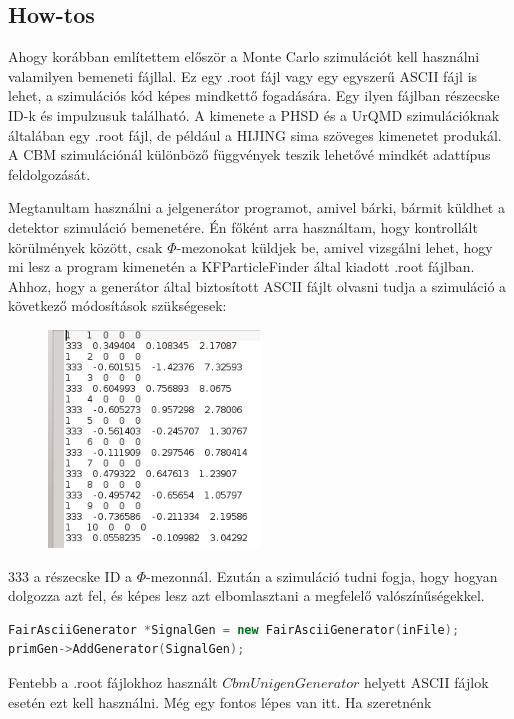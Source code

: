 \documentclass[a4paper,12pt]{article}
\begin{document}
\subsection{ How-tos}
\vspace{3mm}
\par Ahogy korábban említettem először a Monte Carlo szimulációt kell használni valamilyen bemeneti fájllal. Ez egy .root fájl vagy egy 
egyszerű ASCII fájl is lehet, a szimulációs kód képes mindkettő fogadására. Egy ilyen fájlban részecske ID-k és impulzusuk található. A kimenete 
a PHSD és a UrQMD szimulációknak általában egy .root fájl, de például a HIJING sima szöveges kimenetet produkál. A CBM szimulációnál különböző 
függvények teszik lehetővé mindkét adattípus feldolgozását.
\vspace{3mm}
\par Megtanultam használni a jelgenerátor programot, amivel bárki, bármit küldhet a detektor szimuláció bemenetére. Én főként arra használtam, hogy
kontrollált körülmények között, csak $\Phi$-mezonokat küldjek be, amivel vizsgálni lehet, hogy mi lesz a program kimenetén a KFParticleFinder
által kiadott .root fájlban. Ahhoz, hogy a generátor által biztosított ASCII fájlt olvasni tudja a szimuláció a következő módosítások szükségesek:
\begin{figure}[H]
	\centering
	\includegraphics[width=0.5\textwidth]{input.png}
\end{figure}
\par 333 a részecske ID a $\Phi$-mezonnál. Ezután a szimuláció tudni fogja, hogy hogyan dolgozza azt fel, és képes lesz azt elbomlasztani
a megfelelő valószínűségekkel. 
\begin{lstlisting}[language=C++]
FairAsciiGenerator *SignalGen = new FairAsciiGenerator(inFile);
primGen->AddGenerator(SignalGen);
\end{lstlisting}
Fentebb a .root fájlokhoz használt $CbmUnigenGenerator$ helyett ASCII fájlok esetén ezt kell használni. Még egy fontos lépes van itt. Ha szeretnénk
\end{document}
